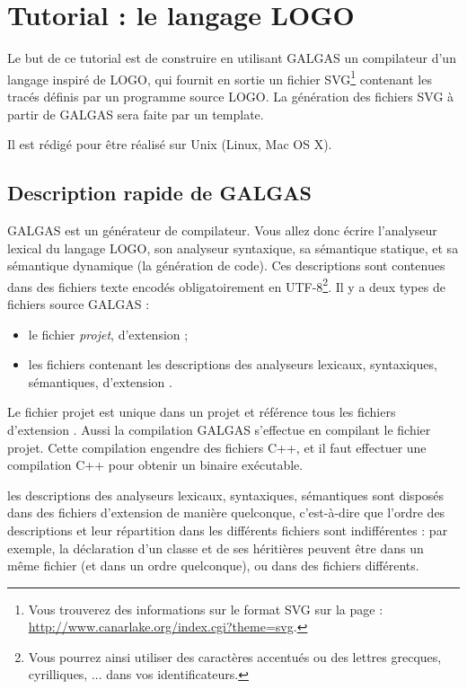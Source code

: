 
\chapter{Tutorial : le langage LOGO}

Le but de ce tutorial est de construire en utilisant GALGAS un compilateur d’un langage inspiré de LOGO, qui fournit en sortie un fichier SVG\footnote{Vous trouverez des informations sur le format SVG sur la page : \url{http://www.canarlake.org/index.cgi?theme=svg}.} contenant les tracés définis par un programme source LOGO. La génération des fichiers SVG à partir de GALGAS sera faite par un template.


Il est rédigé pour être réalisé sur Unix (Linux, Mac OS X).




\section{Description rapide de GALGAS}

GALGAS est un générateur de compilateur. Vous allez donc écrire l'analyseur lexical du langage LOGO, son analyseur syntaxique, sa sémantique statique, et sa sémantique dynamique (la génération de code). Ces descriptions sont contenues dans des fichiers texte encodés obligatoirement en UTF-8\footnote{Vous pourrez ainsi utiliser des caractères accentués ou des lettres grecques, cyrilliques, ... dans vos identificateurs.}. Il y a deux types de fichiers source GALGAS :
\begin{itemize}
\item le fichier \emph{projet}, d'extension  ;
\item les fichiers contenant les descriptions des analyseurs lexicaux, syntaxiques, sémantiques, d'extension .
\end{itemize}

Le fichier projet est unique dans un projet et référence tous les fichiers d'extension . Aussi la compilation GALGAS s'effectue en compilant le fichier projet. Cette compilation engendre des fichiers C++, et il faut effectuer une compilation C++ pour obtenir un binaire exécutable.

les descriptions des analyseurs lexicaux, syntaxiques, sémantiques sont disposés dans des fichiers d'extension  de manière quelconque, c'est-à-dire que l'ordre des descriptions et leur répartition dans les différents fichiers sont indifférentes : par exemple, la déclaration d'un classe et de ses héritières peuvent être dans un même fichier (et dans un ordre quelconque), ou dans des fichiers différents.

